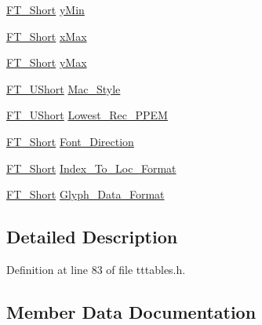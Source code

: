 \begin{DoxyCompactItemize}
\item 
\mbox{\hyperlink{fttypes_8h_aa7279be89046a2563cd3d4d6651fbdcf}{F\+T\+\_\+\+Short}} \mbox{\hyperlink{struct_t_t___header___ac6aad4966bac8a96c5bc48765b3d694a}{y\+Min}}
\item 
\mbox{\hyperlink{fttypes_8h_aa7279be89046a2563cd3d4d6651fbdcf}{F\+T\+\_\+\+Short}} \mbox{\hyperlink{struct_t_t___header___a593b9cc3e11532972a7fc96944dd1ae9}{x\+Max}}
\item 
\mbox{\hyperlink{fttypes_8h_aa7279be89046a2563cd3d4d6651fbdcf}{F\+T\+\_\+\+Short}} \mbox{\hyperlink{struct_t_t___header___a02d236cd8150c00e886a0c487c04dffa}{y\+Max}}
\item 
\mbox{\hyperlink{fttypes_8h_a937f6c17cf5ffd09086d8610c37b9f58}{F\+T\+\_\+\+U\+Short}} \mbox{\hyperlink{struct_t_t___header___a82f2a5a836b802e44ff712b3afc8745c}{Mac\+\_\+\+Style}}
\item 
\mbox{\hyperlink{fttypes_8h_a937f6c17cf5ffd09086d8610c37b9f58}{F\+T\+\_\+\+U\+Short}} \mbox{\hyperlink{struct_t_t___header___a1d20801c3482dee2529d294441ed9af3}{Lowest\+\_\+\+Rec\+\_\+\+P\+P\+EM}}
\item 
\mbox{\hyperlink{fttypes_8h_aa7279be89046a2563cd3d4d6651fbdcf}{F\+T\+\_\+\+Short}} \mbox{\hyperlink{struct_t_t___header___a1cb7d8a2a76ae1acda3ac94bcd555954}{Font\+\_\+\+Direction}}
\item 
\mbox{\hyperlink{fttypes_8h_aa7279be89046a2563cd3d4d6651fbdcf}{F\+T\+\_\+\+Short}} \mbox{\hyperlink{struct_t_t___header___a05a488607bfae319de096b4bd9cf8c6d}{Index\+\_\+\+To\+\_\+\+Loc\+\_\+\+Format}}
\item 
\mbox{\hyperlink{fttypes_8h_aa7279be89046a2563cd3d4d6651fbdcf}{F\+T\+\_\+\+Short}} \mbox{\hyperlink{struct_t_t___header___adeeedce4bb708c3e068ed80366ec921d}{Glyph\+\_\+\+Data\+\_\+\+Format}}
\end{DoxyCompactItemize}


\subsection{Detailed Description}


Definition at line 83 of file tttables.\+h.



\subsection{Member Data Documentation}
\mbox{\label{struct_t_t___header___a5ca008fa01e9568769287febc2abd807}} 
